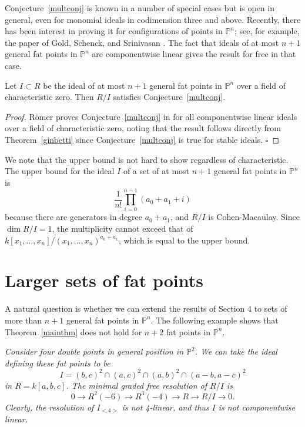 \documentclass{article}
\begin{document}
Conjecture~\ref{multconj} is known in a number of special cases but is open in general, even for monomial ideals in codimension three and above. Recently, there has been interest in proving it for configurations of points in $\mathbb P^n$; see, for example, the paper of Gold, Schenck, and Srinivasan \cite{GSS}. The fact that ideals of at most $n+1$ general fat points in $\mathbb P^n$ are componentwise linear gives the result for free in that case.

\begin{proposition}
\label{multpoints}
Let $I \subset R$ be the ideal of at most $n+1$ general fat points in $\mathbb P^n$ over a field of characteristic zero. Then $R/I$ satisfies Conjecture~\ref{multconj}.
\end{proposition}

\begin{proof}
R{\"o}mer proves Conjecture~\ref{multconj} in \cite{Roemer} for all componentwise linear ideals over a field of characteristic zero, noting that the result follows directly from Theorem~\ref{ginbetti} since Conjecture~\ref{multconj} is true for stable ideals. \hfill $\square$
\end{proof}

We note that the upper bound is not hard to show regardless of characteristic. The upper bound for the ideal $I$ of a set of at most $n+1$ general fat points in $\mathbb P^n$ is \[ \frac{1}{n!} \prod_{i=0}^{n-1} (a_0+a_1+i) \] because there are generators in degree $a_0+a_1$, and $R/I$ is Cohen-Macaulay. Since $\dim R/I=1$, the multiplicity cannot exceed that of $k[x_1,\dots,x_n]/(x_1,\dots,x_n)^{a_0+a_1}$, which is equal to the upper bound.

\section[6]{Larger sets of fat points}\label{s:larger}

A natural question is whether we can extend the results of Section 4 to sets of more than $n+1$ general fat points in $\mathbb P^n$. The following example shows that Theorem~\ref{mainthm} does not hold for $n+2$ fat points in $\mathbb P^n$.
\begin{example}\label{n+2}\emph{Consider four double points in general position in $\mathbb P^2$. We can take the ideal defining these fat points to be \[ I=(b,c)^2 \cap (a,c)^2 \cap (a,b)^2 \cap (a-b,a-c)^2 \] in $R=k[a,b,c]$. The minimal graded free resolution of $R/I$ is \[ 0 \rightarrow R^2(-6) \rightarrow R^3(-4) \rightarrow R \rightarrow R/I \rightarrow 0. \] Clearly, the resolution of $I_{<4>}$ is not 4-linear, and thus $I$ is not componentwise linear.}
\end{example} 
\end{document}

